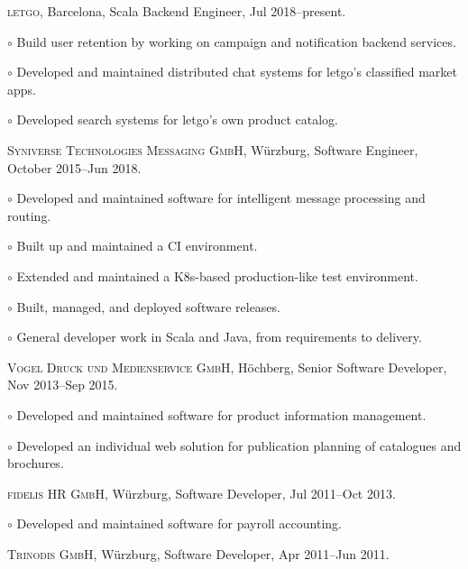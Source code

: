 \documentclass[letterpaper]{article}
\renewenvironment{itemize}{
  \begin{list}{}{
    \setlength{\leftmargin}{1.5em}
  }
}{
  \end{list}
}
\newenvironment{no-indent-itemize}{
  \begin{list}{}{
    \setlength{\leftmargin}{0em}
  }
}{
  \end{list}
}
\def\bullet{$\circ$\xspace}
\begin{document}
\begin{no-indent-itemize}
  \item \textsc{letgo}, Barcelona, Scala Backend Engineer, Jul 2018--present.
  \begin{itemize}
    \item\bullet Build user retention by working on campaign and notification backend services.
    \item\bullet Developed and maintained distributed chat systems for letgo's classified market apps.
    \item\bullet Developed search systems for letgo's own product catalog.
  \end{itemize}
  \item \textsc{Syniverse Technologies Messaging GmbH}, Würzburg, Software Engineer, October 2015--Jun 2018.
  \begin{itemize}
    \item\bullet Developed and maintained software for intelligent message processing and routing.
    \item\bullet Built up and maintained a CI environment.
    \item\bullet Extended and maintained a K8s-based production-like test environment.
    \item\bullet Built, managed, and deployed software releases.
    \item\bullet General developer work in Scala and Java, from requirements to delivery.
  \end{itemize}
  \item \textsc{Vogel Druck und Medienservice GmbH}, Höchberg, Senior Software Developer, Nov 2013--Sep 2015.
  \begin{itemize}
    \item\bullet Developed and maintained software for product information management.
    \item\bullet Developed an individual web solution for publication planning of catalogues and brochures.
  \end{itemize}
  \item \textsc{fidelis HR GmbH}, Würzburg, Software Developer, Jul 2011--Oct 2013. 
  \begin{itemize}
    \item\bullet Developed and maintained software for payroll accounting.
  \end{itemize}
  \item \textsc{Trinodis GmbH}, Würzburg, Software Developer, Apr 2011--Jun 2011. 
  \begin{itemize}

\end{itemize}
\end{no-indent-itemize}
\end{document}
